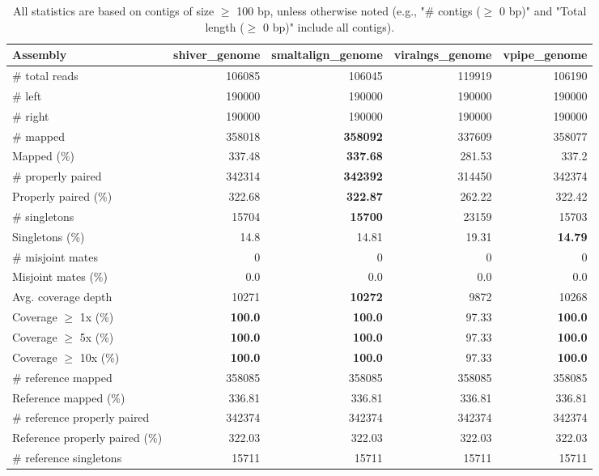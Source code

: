 \documentclass[12pt,a4paper]{article}
\begin{document}
\begin{table}[ht]
\begin{center}
\caption{All statistics are based on contigs of size $\geq$ 100 bp, unless otherwise noted (e.g., "\# contigs ($\geq$ 0 bp)" and "Total length ($\geq$ 0 bp)" include all contigs).}
\begin{tabular}{|l*{4}{|r}|}
\hline
Assembly & shiver\_genome & smaltalign\_genome & viralngs\_genome & vpipe\_genome \\ \hline
\# total reads & 106085 & 106045 & 119919 & 106190 \\ \hline
\# left & 190000 & 190000 & 190000 & 190000 \\ \hline
\# right & 190000 & 190000 & 190000 & 190000 \\ \hline
\# mapped & 358018 & {\bf 358092} & 337609 & 358077 \\ \hline
Mapped (\%) & 337.48 & {\bf 337.68} & 281.53 & 337.2 \\ \hline
\# properly paired & 342314 & {\bf 342392} & 314450 & 342374 \\ \hline
Properly paired (\%) & 322.68 & {\bf 322.87} & 262.22 & 322.42 \\ \hline
\# singletons & 15704 & {\bf 15700} & 23159 & 15703 \\ \hline
Singletons (\%) & 14.8 & 14.81 & 19.31 & {\bf 14.79} \\ \hline
\# misjoint mates & 0 & 0 & 0 & 0 \\ \hline
Misjoint mates (\%) & 0.0 & 0.0 & 0.0 & 0.0 \\ \hline
Avg. coverage depth & 10271 & {\bf 10272} & 9872 & 10268 \\ \hline
Coverage $\geq$ 1x (\%) & {\bf 100.0} & {\bf 100.0} & 97.33 & {\bf 100.0} \\ \hline
Coverage $\geq$ 5x (\%) & {\bf 100.0} & {\bf 100.0} & 97.33 & {\bf 100.0} \\ \hline
Coverage $\geq$ 10x (\%) & {\bf 100.0} & {\bf 100.0} & 97.33 & {\bf 100.0} \\ \hline
\# reference mapped & 358085 & 358085 & 358085 & 358085 \\ \hline
Reference mapped (\%) & 336.81 & 336.81 & 336.81 & 336.81 \\ \hline
\# reference properly paired & 342374 & 342374 & 342374 & 342374 \\ \hline
Reference properly paired (\%) & 322.03 & 322.03 & 322.03 & 322.03 \\ \hline
\# reference singletons & 15711 & 15711 & 15711 & 15711 \\ \hline

\end{tabular}
\end{center}
\end{table}
\end{document}

